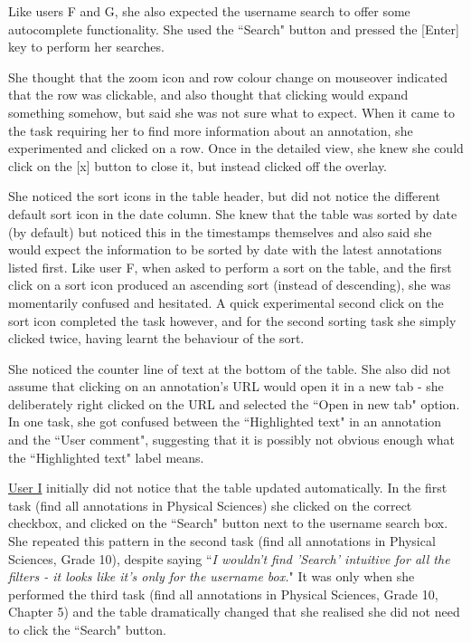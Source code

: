 Like users F and G, she also expected the username search to offer some autocomplete functionality. She used the ``Search" button and pressed the [Enter] key to perform her searches. 

She thought that the zoom icon and row colour change on mouseover indicated that the row was clickable, and also thought that clicking would expand something somehow, but said she was not sure what to expect. When it came to the task requiring her to find more information about an annotation, she experimented and clicked on a row. Once in the detailed view, she knew she could click on the [x] button to close it, but instead clicked off the overlay. 

She noticed the sort icons in the table header, but did not notice the different default sort icon in the date column. She knew that the table was sorted by date (by default) but noticed this in the timestamps themselves and also said she would expect the information to be sorted by date with the latest annotations listed first. Like user F, when asked to perform a sort on the table, and the first click on a sort icon produced an ascending sort (instead of descending), she was momentarily confused and hesitated. A quick experimental second click on the sort icon completed the task however, and for the second sorting task she simply clicked twice, having learnt the behaviour of the sort. 

She noticed the counter line of text at the bottom of the table. She also did not assume that clicking on an annotation's URL would open it in a new tab - she deliberately right clicked on the URL and selected the ``Open in new tab" option. In one task, she got confused between the ``Highlighted text" in an annotation and the ``User comment", suggesting that it is possibly not obvious enough what the ``Highlighted text" label means. 

\underline{User I} initially did not notice that the table updated automatically. In the first task (find all annotations in Physical Sciences) she clicked on the correct checkbox, and clicked on the ``Search" button next to the username search box. She repeated this pattern in the second task (find all annotations in Physical Sciences, Grade 10), despite saying ``\textit{I wouldn't find 'Search' intuitive for all the filters - it looks like it's only for the username box.}" It was only when she performed the third task (find all annotations in Physical Sciences, Grade 10, Chapter 5) and the table dramatically changed that she realised she did not need to click the ``Search" button.  

